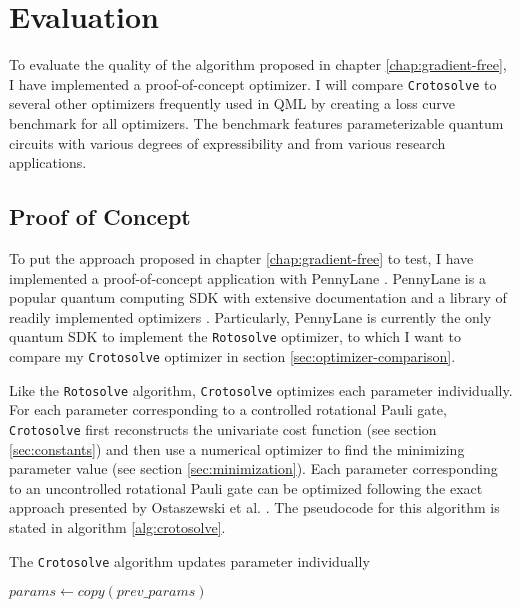 \chapter{Evaluation}
\label{chap:evaluation}

To evaluate the quality of the algorithm proposed in chapter
\ref{chap:gradient-free}, I have implemented a proof-of-concept optimizer.
I will compare \texttt{Crotosolve} to several other optimizers frequently used
in QML by creating a loss curve benchmark for all optimizers.
The benchmark features parameterizable quantum circuits with various degrees of
expressibility and from various research applications.

\section{Proof of Concept}
To put the approach proposed in chapter \ref{chap:gradient-free} to test,
I have implemented a proof-of-concept application with PennyLane
\cite{bergholm_pennylane_2022}.
PennyLane is a popular quantum computing SDK with extensive documentation and a
library of readily implemented optimizers \cite{unitary_fund_team_results_2022}.
Particularly, PennyLane is currently the only quantum SDK to implement the
\texttt{Rotosolve} optimizer, to which I want to compare my \texttt{Crotosolve}
optimizer in section \ref{sec:optimizer-comparison}.

Like the \texttt{Rotosolve} algorithm, \texttt{Crotosolve} optimizes each
parameter individually.
For each parameter corresponding to a controlled rotational Pauli gate,
\texttt{Crotosolve} first reconstructs the univariate cost function (see section
\ref{sec:constants}) and then use a numerical optimizer to find the minimizing
parameter value (see section \ref{sec:minimization}).
Each parameter corresponding to an uncontrolled rotational Pauli gate can be
optimized following the exact approach presented by Ostaszewski et al.
\cite{ostaszewski_structure_2021}.
The pseudocode for this algorithm is stated in algorithm \ref{alg:crotosolve}.

\begin{algorithm}
    \caption{The \texttt{Crotosolve} algorithm updates parameter individually}
    \label{alg:crotosolve}
    \BlankLine
    $params \gets copy(prev\_params)$\;
\end{algorithm}

